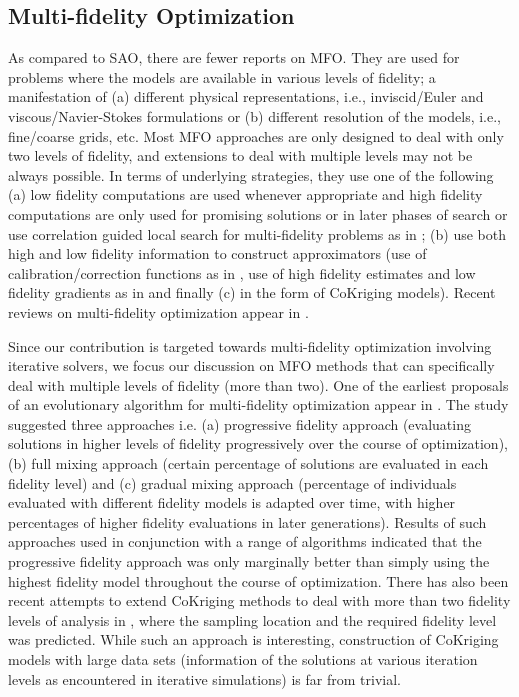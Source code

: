 \subsection{Multi-fidelity Optimization}
As compared to SAO, there are fewer reports on MFO. They are used for problems where the models are available in various levels of fidelity; a manifestation of (a) different physical representations, i.e., inviscid/Euler and viscous/Navier-Stokes formulations or (b) different resolution of the models, i.e., fine/coarse grids, etc. Most MFO approaches are only designed to deal with only two levels of fidelity, and extensions to deal with multiple levels may not be always possible. In terms of underlying strategies, they use one of the following (a) low fidelity computations are used whenever appropriate and high fidelity computations are only used for promising solutions or in later phases of search \cite{ray2002fidelity} or use correlation guided local search for
multi-fidelity problems as in \cite{lim2008dynamic}; (b) use both high and low fidelity information to
construct approximators (use of calibration/correction functions as in \cite{chen2015,courrier2014}, use of high fidelity estimates and low fidelity gradients as in \cite{balabanov2004} and finally (c) in the form of CoKriging models). Recent reviews on multi-fidelity optimization appear in \cite{wilcox2016,godino2016}.

Since our contribution is targeted towards multi-fidelity optimization involving iterative solvers, we focus our discussion on MFO methods that can specifically deal with multiple levels of fidelity (more than two). One of the earliest proposals of an evolutionary algorithm for multi-fidelity optimization appear in \cite{beltagy1999multilevel}. The study suggested three approaches i.e. (a) progressive fidelity approach (evaluating solutions in higher levels of fidelity progressively over the course of optimization), (b) full mixing approach (certain percentage of solutions are evaluated in each fidelity level) and (c) gradual mixing approach (percentage of individuals evaluated with different fidelity models is adapted over time, with higher percentages of higher fidelity evaluations in later generations). Results of such approaches used in conjunction with a range of algorithms indicated that the progressive fidelity approach was only marginally better than simply using the highest fidelity model throughout the course of optimization. There has also been recent attempts to extend CoKriging methods to deal with more than two fidelity levels of analysis in \cite{le2015cokriging}, where the sampling location and the required fidelity level was predicted. While such an approach is interesting, construction of CoKriging models with large data sets (information of the solutions at 
various iteration levels as encountered in iterative simulations) is far from trivial. 


